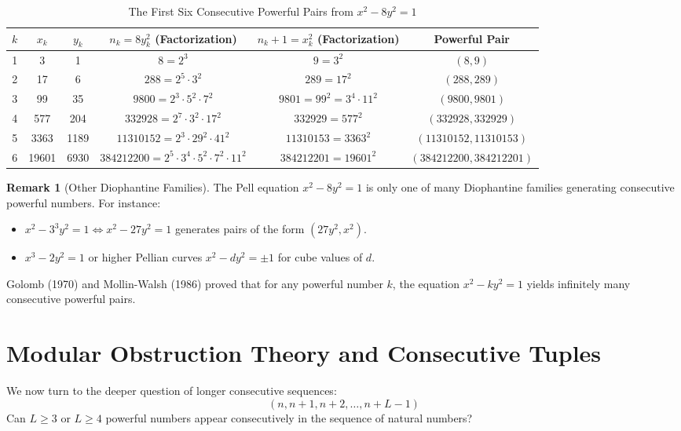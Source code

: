 \documentclass[11pt,a4paper]{article}
\theoremstyle{definition}
\newtheorem{remark}[theorem]{Remark}
\begin{document}
\begin{table}[ht]
\centering
\small
\caption{The First Six Consecutive Powerful Pairs from $x^2 - 8y^2 = 1$}
\label{tab:pairs}
\vspace{0.5em}
\begin{tabular}{@{}cccccc@{}}
\toprule
$k$ & $x_k$ & $y_k$ & $n_k = 8y_k^2$ (Factorization) & $n_k + 1 = x_k^2$ (Factorization) & Powerful Pair \\
\midrule
1 & 3 & 1 & $8 = 2^3$ & $9 = 3^2$ & $(8, 9)$ \\
2 & 17 & 6 & $288 = 2^5 \cdot 3^2$ & $289 = 17^2$ & $(288, 289)$ \\
3 & 99 & 35 & $9800 = 2^3 \cdot 5^2 \cdot 7^2$ & $9801 = 99^2 = 3^4 \cdot 11^2$ & $(9800, 9801)$ \\
4 & 577 & 204 & $332928 = 2^7 \cdot 3^2 \cdot 17^2$ & $332929 = 577^2$ & $(332928, 332929)$ \\
5 & 3363 & 1189 & $11310152 = 2^3 \cdot 29^2 \cdot 41^2$ & $11310153 = 3363^2$ & $(11310152, 11310153)$ \\
6 & 19601 & 6930 & $384212200 = 2^5 \cdot 3^4 \cdot 5^2 \cdot 7^2 \cdot 11^2$ & $384212201 = 19601^2$ & $(384212200, 384212201)$ \\
\bottomrule
\end{tabular}
\end{table}

\begin{remark}[Other Diophantine Families]
The Pell equation $x^2 - 8y^2 = 1$ is only one of many Diophantine families generating consecutive powerful numbers. For instance:
\begin{itemize}
    \item $x^2 - 3^3 y^2 = 1 \iff x^2 - 27y^2 = 1$ generates pairs of the form $(27y^2, x^2)$.
    \item $x^3 - 2y^2 = 1$ or higher Pellian curves $x^2 - d y^2 = \pm 1$ for cube values of $d$.
\end{itemize}
Golomb (1970) \cite{golomb1970} and Mollin-Walsh (1986) \cite{mollin1986} proved that for any powerful number $k$, the equation $x^2 - k y^2 = 1$ yields infinitely many consecutive powerful pairs.
\end{remark}

\section{Modular Obstruction Theory and Consecutive Tuples}

We now turn to the deeper question of longer consecutive sequences:
\[ (n, n+1, n+2, \dots, n+L-1) \]
Can $L \ge 3$ or $L \ge 4$ powerful numbers appear consecutively in the sequence of natural numbers?
\end{document}
